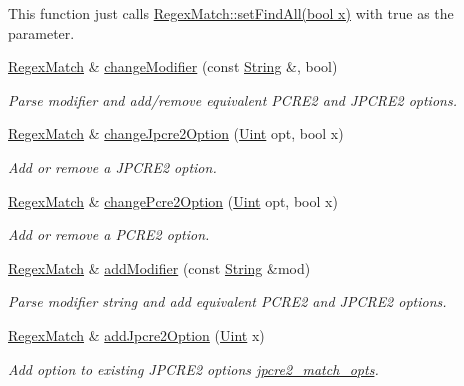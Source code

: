\begin{DoxyCompactItemize}
\begin{DoxyCompactList}
This function just calls \hyperlink{classjpcre2_1_1RegexMatch_ae586d43ec197c57c66086eeb4f8d83a1}{Regex\+Match\+::set\+Find\+All(bool x)} with {\ttfamily true} as the parameter. \end{DoxyCompactList}\item 
\hyperlink{classjpcre2_1_1RegexMatch}{Regex\+Match} \& \hyperlink{classjpcre2_1_1RegexMatch_a877be3123d789020d259939bc79e8cfe}{change\+Modifier} (const \hyperlink{namespacejpcre2_a91f03070152fb228bc116c5a737f1d16}{String} \&, bool)
\begin{DoxyCompactList}\small\item\em Parse modifier and add/remove equivalent P\+C\+R\+E2 and J\+P\+C\+R\+E2 options. \end{DoxyCompactList}\item 
\hyperlink{classjpcre2_1_1RegexMatch}{Regex\+Match} \& \hyperlink{classjpcre2_1_1RegexMatch_a154430c66b8794d6632be6211a3ce870}{change\+Jpcre2\+Option} (\hyperlink{namespacejpcre2_a078242d38221a13fb3543b9edd78c099}{Uint} opt, bool x)
\begin{DoxyCompactList}\small\item\em Add or remove a J\+P\+C\+R\+E2 option. \end{DoxyCompactList}\item 
\hyperlink{classjpcre2_1_1RegexMatch}{Regex\+Match} \& \hyperlink{classjpcre2_1_1RegexMatch_a6893abc21b24a9d9fca146a33c0f823c}{change\+Pcre2\+Option} (\hyperlink{namespacejpcre2_a078242d38221a13fb3543b9edd78c099}{Uint} opt, bool x)
\begin{DoxyCompactList}\small\item\em Add or remove a P\+C\+R\+E2 option. \end{DoxyCompactList}\item 
\hyperlink{classjpcre2_1_1RegexMatch}{Regex\+Match} \& \hyperlink{classjpcre2_1_1RegexMatch_a08c2e481fe8b9c001e67733fb4e33972}{add\+Modifier} (const \hyperlink{namespacejpcre2_a91f03070152fb228bc116c5a737f1d16}{String} \&mod)
\begin{DoxyCompactList}\small\item\em Parse modifier string and add equivalent P\+C\+R\+E2 and J\+P\+C\+R\+E2 options. \end{DoxyCompactList}\item 
\hyperlink{classjpcre2_1_1RegexMatch}{Regex\+Match} \& \hyperlink{classjpcre2_1_1RegexMatch_a0a4cf8554a7e00f3cf2db34f60a43f60}{add\+Jpcre2\+Option} (\hyperlink{namespacejpcre2_a078242d38221a13fb3543b9edd78c099}{Uint} x)
\begin{DoxyCompactList}\small\item\em Add option to existing J\+P\+C\+R\+E2 options \hyperlink{classjpcre2_1_1RegexMatch_a70d62df887eeed237724f64fbc378700}{jpcre2\+\_\+match\+\_\+opts}. \end{DoxyCompactList}\item 

\end{DoxyCompactItemize}
